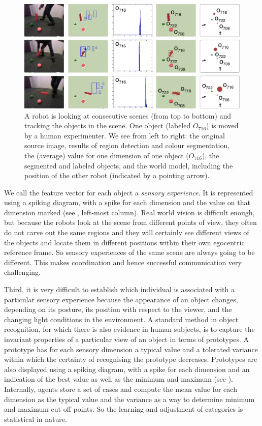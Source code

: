 \begin{figure}[htbp]
  \centerline{\includegraphics[width=.85\textwidth]{chap10/figs/png-perception.pdf}}
\caption{\label{fig:png-perception}A robot is looking at consecutive scenes (from top to bottom) and tracking the objects in the scene. One object (labeled $O_{716}$)
is moved by a human experimenter.  We see from left to right: the original source image, results of region detection and 
colour segmentation, the (average) value for one dimension of one object ($O_{716}$), the segmented and labeled objects, 
and the world model, including the position of the other robot (indicated by a pointing arrow). }
\end{figure}

We call the feature vector for each object a {\itshape sensory experience}. 
It is represented using a spiking 
diagram, with a spike for each dimension and the value on that dimension marked (see 
, left-most column). Real
world vision is difficult enough, but because the robots look at the
scene from different points of view, they often do not carve out the
same regions and they will certainly see different views of the
objects and locate them in different positions within their own
egocentric reference frame. So sensory experiences of the same scene
are always going to be different. This makes coordination and hence successful
communication very challenging. 

Third, it is very difficult to establish which individual is associated with a particular
sensory experience because the appearance of an object changes, depending on
its posture, its position with respect to the viewer, and the changing
light conditions in the environment. A standard method in object
recognition, for which there is also evidence in human subjects, is to
capture the invariant properties of a particular view of an object in
terms of prototypes. A prototype has for each sensory dimension a typical value and a tolerated variance
within which the certainty of recognising the prototype decreases. Prototypes are also displayed using a spiking 
diagram, with a spike for each dimension and an indication of the best value as well as the minimum and maximum
(see ). Internally, agents store a set of cases 
and compute the mean value for each dimension as the typical value and the variance as a way to determine 
minimum and maximum cut-off points. So the learning and adjustment of categories is statistical in nature. 

